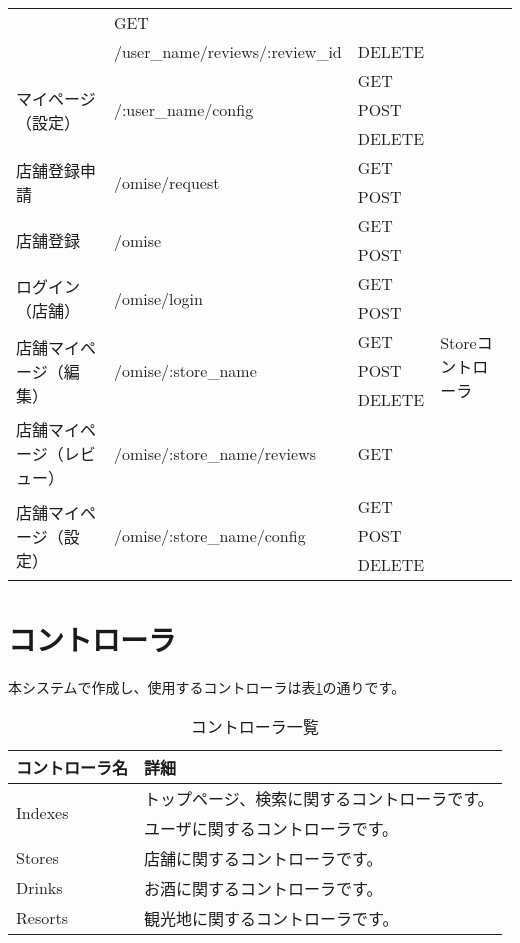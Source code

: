 \documentclass[a4j,titlepage]{jarticle}
\begin{document}
\begin{description}
\begin{table}[!htbp]
\begin{center}
\begin{tabular}{|l|l|l|p{4cm}|}
& GET & \\\cline{2-3}
 & /user\_name/reviews/:review\_id & DELETE & \\\cline{1-3}
\multirow{3}{*}{マイページ（設定）} & \multirow{3}{*}{/:user\_name/config}
& GET & \\\cline{3-3}
 & & POST & \\\cline{3-3}
 & & DELETE & \\\hline
 \multirow{2}{*}{店舗登録申請} & \multirow{2}{*}{/omise/request}
 & GET & \multirow{13}{*}{Storeコントローラ} \\\cline{3-3}
  & & POST &\\\cline{1-3}
 \multirow{2}{*}{店舗登録} & \multirow{2}{*}{/omise}
 & GET &\\\cline{3-3}
  & & POST &\\\cline{1-3}
 \multirow{2}{*}{ログイン（店舗）} & \multirow{2}{*}{/omise/login}
 & GET & \\\cline{3-3}
  & & POST & \\\cline{1-3}
\multirow{3}{*}{店舗マイページ（編集）}& \multirow{3}{*}{/omise/:store\_name}
& GET & \\\cline{3-3}
 & & POST & \\\cline{3-3}
 & & DELETE & \\\cline{1-3}
店舗マイページ（レビュー） & /omise/:store\_name/reviews
& GET & \\\cline{1-3}
\multirow{3}{*}{店舗マイページ（設定）} & \multirow{3}{*}{/omise/:store\_name/config}
& GET & \\\cline{3-3}
 & & POST & \\\cline{3-3}
 & & DELETE & \\\hline
\end{tabular}
\end{center}
\end{table}

\section{コントローラ}
本システムで作成し、使用するコントローラは表\ref{controller}の通りです。

\begin{table}[!htbp]
\caption{コントローラ一覧}
\label{controller}
\small
\begin{center}
\begin{tabular}{|l|p{5cm}|}\hline
コントローラ名 & 詳細 \\\hline\hline
\multirow{2}{*}{Indexes} & トップページ、検索に関するコントローラです。 \\\hline
Users & ユーザに関するコントローラです。 \\\hline
Stores & 店舗に関するコントローラです。 \\\hline
Drinks & お酒に関するコントローラです。 \\\hline
Resorts & 観光地に関するコントローラです。 \\\hline
\end{tabular}
\end{center}
\end{table}


\end{description}
\end{document}
